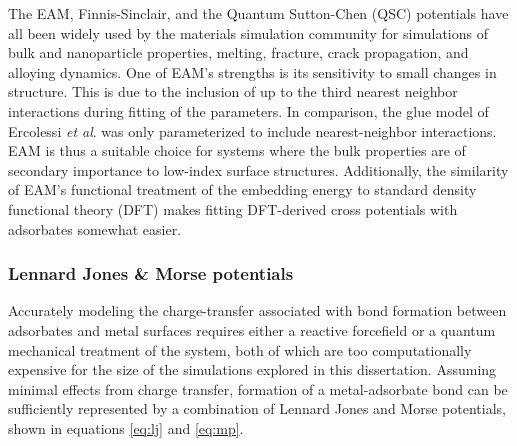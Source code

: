 
The EAM, Finnis-Sinclair, and the Quantum Sutton-Chen (QSC) potentials
have all been widely used by the materials simulation community for
simulations of bulk and nanoparticle
properties,\citep{Chui:2003fk, Wang:2005qy, Medasani:2007uq, Mishin:1999ew}
melting,\citep{Belonoshko:2000jk, Sankaranarayanan:2006ye, Sankaranarayanan:2005bh}
fracture,\citep{Shastry:1996qg, Shastry:1998dx, Mishin:2001qt} crack
propagation, \citep{Becquart:1993sr, Rifkin:1992ug} and alloying
dynamics.\citep{Shibata:2002hh, Mishin:2002if, Zope:2003ai, Mishin:2005vc}
One of EAM's strengths is its sensitivity to small changes in
structure. This is due to the inclusion of up to the third nearest
neighbor interactions during fitting of the parameters.\citep{Voter:1995ax}
In comparison, the glue model of Ercolessi {\it et
  al}.\citep{Ercolessi:1988uo} was only parameterized to include
nearest-neighbor interactions. EAM is thus a suitable choice for systems
where the bulk properties are of secondary importance to low-index
surface structures. Additionally, the similarity of EAM's functional
treatment of the embedding energy to standard density functional
theory (DFT) makes fitting DFT-derived cross potentials with
adsorbates somewhat easier.

\subsubsection{Lennard Jones \& Morse potentials}
Accurately modeling the charge-transfer associated with bond formation between
adsorbates and metal surfaces requires either a reactive forcefield or a
quantum mechanical treatment of the system, both of which are too computationally expensive
for the size of the simulations explored in this dissertation. Assuming minimal effects
from charge transfer, formation
of a metal-adsorbate bond can be sufficiently represented by a combination of
Lennard Jones and Morse potentials, shown in equations \ref{eq:lj} and \ref{eq:mp}.

